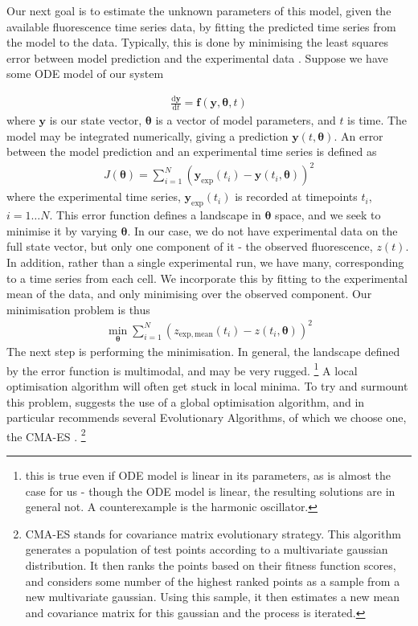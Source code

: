 \documentclass[10pt,journal]{./IEEE_latex_class/IEEEtran}
\begin{document}
Our next goal is to estimate the unknown parameters of this model, given the available fluorescence time series data, by fitting the predicted time series from the model to the data. Typically, this is done by minimising the least squares error between model prediction and the experimental data \cite{Brewer2008,Algorithms2003, Hu2015}. Suppose we have some ODE model of our system

\begin{align}
\frac{\mathrm{d}\mathbf{y}}{\mathrm{d}t} = \mathbf{f}(\mathbf{y},\boldsymbol{\theta},t)
\end{align}
where $\mathbf{y}$ is our state vector, $\boldsymbol{\theta}$ is a vector of model parameters, and $t$ is time. The model may be integrated numerically, giving a prediction $\mathbf{y}(t,\boldsymbol{\theta})$. An error between the model prediction and an experimental time series is defined as
\begin{align}
J(\boldsymbol{\theta}) = \sum_{i =1}^{N} (\mathbf{y}_{\mathrm{exp}}(t_{i}) - \mathbf{y}(t_{i},\boldsymbol{\theta}))^2
\end{align}
where the experimental time series, $\mathbf{y}_{\mathrm{exp}}(t_{i})$ is recorded at timepoints $t_{i}$, $i = 1 \hdots N$. This error function defines a landscape in $\boldsymbol{\theta}$ space, and we seek to minimise it by varying $\boldsymbol{\theta}$. In our case, we do not have experimental data on the full state vector, but only one component of it - the observed fluorescence, $z(t)$. In addition, rather than a single experimental run, we have many, corresponding to a time series from each cell. We incorporate this by fitting to the experimental mean of the data, and only minimising over the observed component. Our minimisation problem is thus
\begin{align}
\min_{\boldsymbol{\theta}} \sum_{i =1}^{N} (z_{\mathrm{exp, mean}}(t_{i}) - z(t_{i},\boldsymbol{\theta}))^2
\end{align}
The next step is performing the minimisation. In general, the landscape defined by the error function is multimodal, and may be very rugged. \footnote{this is true even if ODE model is linear in its parameters, as is almost the case for us - though the ODE model is linear, the resulting solutions are in general not. A counterexample is the harmonic oscillator.} A local optimisation algorithm will often get stuck in local minima. To try and surmount this problem, \cite{Algorithms2003} suggests the use of a global optimisation algorithm, and in particular recommends several Evolutionary Algorithms, of which we choose one, the CMA-ES \cite{Hansen2006,Hansen2011}. \footnote{CMA-ES stands for covariance matrix evolutionary strategy. This algorithm generates a population of test points according to a multivariate gaussian distribution. It then ranks the points based on their fitness function scores, and  considers some number of the highest ranked points as a sample from a new multivariate gaussian. Using this sample, it then estimates a new mean and covariance matrix for this gaussian and the process is iterated.}
\end{document}
